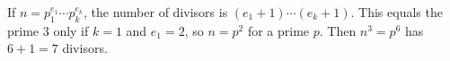 If $n=p_1^{e_1}\cdots p_k^{e_k}$, the number of divisors is $(e_1+1)\cdots(e_k+1)$. This equals the prime $3$ only if $k=1$ and $e_1=2$, so $n=p^2$ for a prime $p$. Then $n^3=p^6$ has $6+1=\boxed{7}$ divisors.
